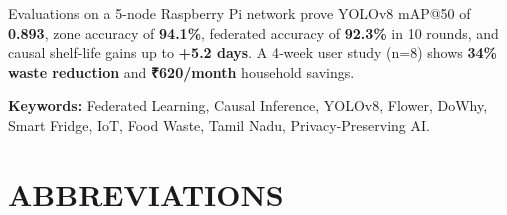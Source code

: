 \documentclass[12pt,a4paper]{report}
\begin{document}
Evaluations on a 5-node Raspberry Pi network prove YOLOv8 mAP@50 of \textbf{0.893}, zone accuracy of \textbf{94.1\%}, federated accuracy of \textbf{92.3\%} in 10 rounds, and causal shelf-life gains up to \textbf{+5.2 days}. A 4‑week user study (n=8) shows \textbf{34\% waste reduction} and \textbf{₹620/month} household savings.

\vspace{0.3cm}
\noindent\textbf{Keywords:} Federated Learning, Causal Inference, YOLOv8, Flower, DoWhy, Smart Fridge, IoT, Food Waste, Tamil Nadu, Privacy-Preserving AI.

\tableofcontents
\listoftables
{}
\listoffigures
{}

\chapter*{ABBREVIATIONS}
\end{document}
